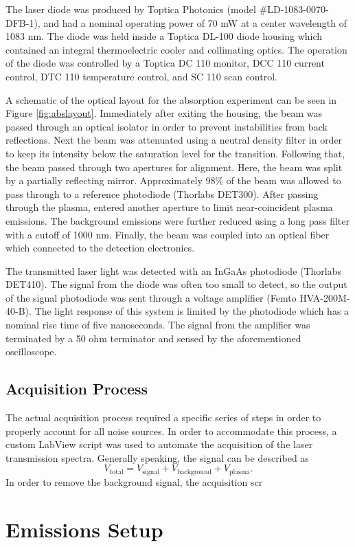 The laser diode was produced by Toptica Photonics (model
\#LD-1083-0070-DFB-1), and had a nominal operating power of 70 mW at a
center wavelength of 1083 nm. The diode was held inside a Toptica DL-100
diode housing which contained an integral thermoelectric cooler and
collimating optics. The operation of the diode was controlled by a
Toptica DC 110 monitor, DCC 110 current control, DTC 110 temperature
control, and SC 110 scan control.

A schematic of the optical layout for the absorption experiment can be
seen in Figure \ref{fig:abslayout}. Immediately after exiting the
housing, the beam was passed through an optical isolator in order to
prevent instabilities from back reflections. Next the beam was
attenuated using a neutral density filter in order to keep its intensity
below the saturation level for the transition. Following that, the beam
passed through two apertures for alignment. Here, the beam was split by
a partially reflecting mirror. Approximately 98\% of the beam was
allowed to pass through to a reference photodiode (Thorlabs DET300).
After passing through the plasma, entered another aperture to limit
near-coincident plasma emissions. The background emissions were further
reduced using a long pass filter with a cutoff of 1000 nm. Finally, the
beam was coupled into an optical fiber which connected to the detection
electronics.

The transmitted laser light was detected with an InGaAs photodiode
(Thorlabs DET410). The signal from the diode was often too small to
detect, so the output of the signal photodiode was sent through a
voltage amplifier (Femto HVA-200M-40-B). The light response of this
system is limited by the photodiode which has a nominal rise time of
five nanoseconds. The signal from the amplifier was terminated by a 50
ohm terminator and sensed by the aforementioned oscilloscope.

\subsection{Acquisition Process} The actual acquisition process required
a specific series of steps in order to properly account for all noise
sources. In order to accommodate this process, a custom LabView script
was used to automate the acquisition of the laser transmission spectra.
Generally speaking, the signal can be described as
\begin{equation}
  V_\mathrm{total} = V_\mathrm{signal} + V_\mathrm{background} +
                     V_\mathrm{plasma}.
\end{equation}
In order to remove the background signal, the acquisition scr

\section{Emissions Setup}
